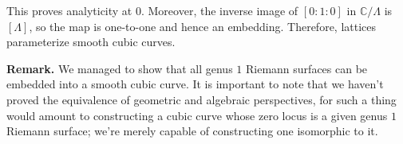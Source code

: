 \documentclass[11pt,a4paper]{article}
\begin{document}
This proves analyticity at $0$. Moreover, the inverse image of $[0:1:0]$ in $\mathbb{C}/\Lambda$ is $[\Lambda]$, so the map is one-to-one and hence an embedding. Therefore, lattices parameterize smooth cubic curves.

\textbf{Remark.} We managed to show that all genus $1$ Riemann surfaces can be embedded into a smooth cubic curve. It is important to note that we haven't proved the equivalence of geometric and algebraic perspectives, for such a thing would amount to constructing a cubic curve whose zero locus is a given genus $1$ Riemann surface; we're merely capable of constructing one isomorphic to it.

\end{document}
